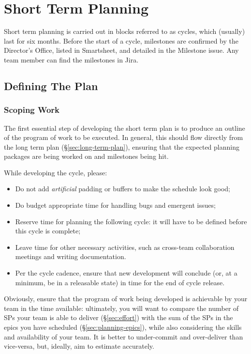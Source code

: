 \section{Short Term Planning}
\label{sec:cycle-plan}

Short term planning is carried out in blocks referred to as \glspl{cycle}, which (usually) last for six months.
Before the start of a \gls{cycle}, milestones are confirmed by the Director's Office, listed in Smartsheet, and detailed in the Milestone issue. Any team member can find the milestones in Jira.

\subsection{Defining The Plan}

\subsubsection{Scoping Work}

The first essential step of developing the short term plan is to produce an outline of the program of work to be executed.
In general, this should flow directly from the long term plan (\S\ref{sec:long-term-plan}), ensuring that the expected planning packages are being worked on and milestones being hit.

While developing the \gls{cycle}, please:

\begin{itemize}
\item
  Do not add \emph{artificial} padding or buffers to make the schedule look good;
\item
  Do budget appropriate time for handling bugs and emergent issues;
\item
  Reserve time for planning the following \gls{cycle}: it will have to be defined before this \gls{cycle} is complete;
\item
  Leave time for other necessary activities, such as cross-team collaboration meetings and writing documentation.
\item
  Per the \gls{cycle} cadence, ensure that new development will conclude (or, at a minimum, be in a releasable state) in time for the end of \gls{cycle} release.
\end{itemize}

Obviously, ensure that the program of work being developed is achievable by your team in the time available: ultimately, you will want to compare the number of \glspl{SP} your team is able to deliver (\S\ref{sec:effort}) with the sum of the \glspl{SP} in the \glspl{epic} you have scheduled (\S\ref{sec:planning-epics}), while also considering the skills and availability of your team.
It is better to under-commit and over-deliver than vice-versa, but, ideally, aim to estimate accurately.

